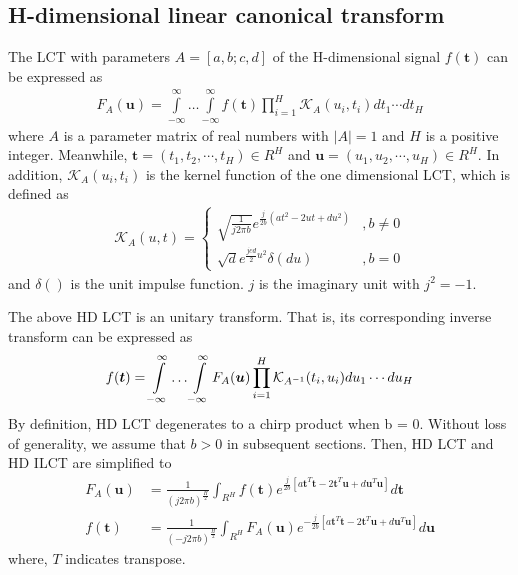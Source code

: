 \documentclass[journal]{IEEEtran}
\begin{document}
\subsection{H-dimensional linear canonical transform}
The LCT with parameters $ A = [a,b;c,d]$ of the H-dimensional signal $ f(\boldsymbol t) $  can be expressed as
 \begin{align}
 	{F_A}(\boldsymbol u) = \int\limits_{ - \infty }^\infty   \ldots  \int\limits_{ - \infty }^\infty  {f(\boldsymbol t)\prod\limits_{i = 1}^H {{\mathcal{K}_A}({u_i},{t_i})} } d{t_1} \cdots d{t_H}
 \end{align}
where $A$ is a parameter matrix of real numbers with $ \left| A \right| = 1 $ and $H$ is a positive integer. Meanwhile, $ \boldsymbol t = ({t_1},{t_2}, \cdots, {t_H}) \in {R^H} $ and $ \boldsymbol u = ({u_1},{u_2}, \cdots , {u_H}) \in {R^H} $. In addition, $\mathcal{K} _A ({u_i},{t_i})$ is the kernel function of the one dimensional LCT, which is defined as  
\begin{align}
	{\mathcal{K}_A}({u},{t}) = \left\{ {\begin{array}{*{20}{c}}
		{\sqrt {\frac{1}{{j2\pi b}}} e^ {\frac{j}{{2b}}(at^2 - 2{u}{t} + du^2)}}&{,b \ne 0}\\
		{\sqrt d e^{ \frac{{jcd}}{2}u^2 }\delta (d{u})}&{,b = 0}
   \end{array}} \right.
\end{align}
and $ \delta() $ is the unit impulse function. $j$ is the imaginary unit with ${j^2} =  - 1$.

The above HD LCT is an unitary transform. That is, its corresponding inverse transform can be expressed as
\begin{align}
	f(\boldsymbol t) = \int\limits_{ - \infty }^\infty   \ldots  \int\limits_{ - \infty }^\infty  {{F_{{A}}}({\boldsymbol {u}})\prod\limits_{i = 1}^H {{{\cal K}_{A^{ - 1}}}({t_i},{u_i})} } d{u_1} \cdots d{u_H}
\end{align}
By definition, HD LCT degenerates to a chirp product when b = 0. Without loss of generality, we assume that $b > 0$ in subsequent sections. Then, HD LCT and HD ILCT are simplified to
\begin{align}  \label{HD LCT}
		{F_A}(\boldsymbol u) &= \frac{1}{{{{(j2\pi b)}^{\frac{H}{2}}}}}\int_{{R^H}} {f(\boldsymbol t){e^{\frac{j}{{2b}}[a{\boldsymbol t^T}\boldsymbol t - 2{\boldsymbol t^T}\boldsymbol u + d{\boldsymbol u^T}\boldsymbol u]}}} d\boldsymbol t\\
		f(\boldsymbol t) &= \frac{1}{{{{( - j2\pi b)}^{\frac{H}{2}}}}}\int_{{R^H}} {{F_A}(\boldsymbol u){e^{ - \frac{j}{{2b}}[a{\boldsymbol t^T}\boldsymbol t - 2{\boldsymbol t^T}\boldsymbol u + d{\boldsymbol u^T}\boldsymbol u]}}} d\boldsymbol u
		\label{HD ILCT}
\end{align}
where, $T$ indicates transpose.
\end{document}

